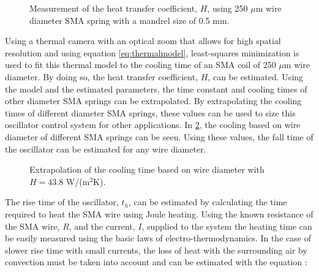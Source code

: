 \begin{figure}[htb!] %
  \centering
  \resizebox{0.8\textwidth}{!}{}
  \caption{Measurement of the heat transfer coefficient, $H$, using 250 $\mu$m wire diameter SMA spring with a mandrel size of 0.5 mm.}
  \label{fig:thermal-fitting}
\end{figure}

Using a thermal camera with an optical zoom that allows for high spatial resolution and using equation \ref{eq:thermalmodel}, least-squares minimization is used to fit this thermal model to the cooling time of an SMA coil of 250 $\mu$m wire diameter. By doing so, the heat transfer coefficient, $H$, can be estimated. Using the model and the estimated parameters, the time constant and cooling times of other diameter SMA springs can be extrapolated. By extrapolating the cooling times of different diameter SMA springs, these values can be used to size this oscillator control system for other applications. In \cref{fig:cooling-time-extrapolation}, the cooling based on wire diameter of different SMA springs can be seen. Using these values, the fall time of the oscillator can be estimated for any wire diameter.

\begin{figure}[htb!] %
  \centering
  \resizebox{0.8\textwidth}{!}{}
  \caption{Extrapolation of the cooling time based on wire diameter with $H = 43.8$ W/(m$^2$K).}
  \label{fig:cooling-time-extrapolation}
\end{figure}

The rise time of the oscillator, $t_h$, can be estimated by calculating the time required to heat the SMA wire using Joule heating. Using the known resistance of the SMA wire, $R$, and the current, $I$, supplied to the system the heating time can be easily measured using the basic laws of electro-thermodynamics. In the case of slower rise time with small currents, the loss of heat with the surrounding air by convection must be taken into account and can be estimated with the equation :

